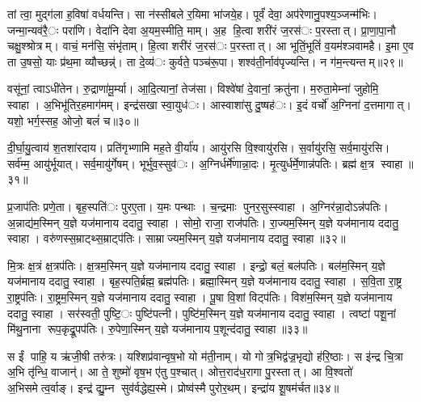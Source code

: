 तां त्वा॒ मुद्ग॑ला ह॒विषा॑ वर्धयन्ति। सा न॑स्सीबले र॒यिमा भा॑जये॒ह। पूर्वं॑ देवा॒ अप॑रेणानु॒पश्य॒ञ्जन्म॑भिः। जन्मा॒न्यव॑रै॒ः परा॑णि। वेदा॑नि देवा अ॒यम॒स्मीति॒ माम्। अ॒ह हि॒त्वा शरी॑रं ज॒रस॑ः प॒रस्तात्। प्रा॒णा॒पा॒नौ चक्षु॒श्श्रोत्रम्। वाचं॒ मन॑सि॒ संभृ॑ताम्। हि॒त्वा शरी॑रं ज॒रस॑ः प॒रस्तात्। आ भूतिं॒भूतिं॑ व॒यम॑श्ञवामहै। इ॒मा ए॒व ता उ॒षसो॒ याः प्र॑थ॒मा व्यौच्छन्न्॑। ता दे॒व्य॑ः कुर्वते॒ पञ्च॑रू॒पा। शश्व॑ती॒र्नाव॑पृज्यन्ति। न ग॑म॒न्त्यन्तम्॥२९॥


वसू॑नां॒ त्वाऽधी॑तेन। रु॒द्राणा॑मू॒र्म्या। आ॒दि॒त्यानां॒ तेज॑सा। विश्वे॑षां दे॒वानां॒ क्रतु॑ना। म॒रुता॒मेम्ना॑ जुहोमि॒ स्वाहा। अ॒भिभू॑तिर॒हमाग॑मम्। इन्द्र॑सखा स्वा॒युध॑ः। आस्वाशा॑सु दु॒ष्षह॑ः। इ॒दं वर्चो॑ अ॒ग्निना॑ द॒त्तमागात्। यशो॒ भर्ग॒स्सह॒ ओजो॒ बलं॑ च॥३०॥

दी॒र्घा॒यु॒त्वाय॑ श॒तशा॑रदाय। प्रति॑गृभ्णामि मह॒ते वी॒र्या॑य। आयु॑रसि वि॒श्वायु॑रसि। स॒र्वायु॑रसि॒ सर्व॒मायु॑रसि। सर्व॑म्म॒ आयु॑र्भूयात्। सर्व॒मायु॑र्गेषम्। भूर्भुव॒स्सुव॑ः। अ॒ग्निर्धर्मे॑णान्ना॒दः। मृ॒त्युर्धर्मे॒णान्न॑पतिः। ब्रह्म॑ क्ष॒त्र स्वाहा॥३१॥

प्र॒जाप॑तिः प्रणे॒ता। बृह॒स्पति॑ः पुरए॒ता। य॒मः पन्थाः। च॒न्द्रमाः पुनर॒सुस्स्वाहा। अ॒ग्निर॑न्ना॒दोऽन्न॑पतिः। अ॒न्नाद्य॑म॒स्मिन् य॒ज्ञे यज॑मानाय ददातु॒ स्वाहा। सोमो॒ राजा॒ राज॑पतिः। रा॒ज्यम॒स्मिन् य॒ज्ञे यज॑मानाय ददातु॒ स्वाहा। वरु॑णस्स॒म्राट्थ्स॒म्राट्प॑तिः। साम्राज्यम॒स्मिन् य॒ज्ञे यज॑मानाय ददातु॒ स्वाहा॥३२॥

मि॒त्रः क्ष॒त्रं क्ष॒त्रप॑तिः। क्ष॒त्रम॒स्मिन् य॒ज्ञे यज॑मानाय ददातु॒ स्वाहा। इन्द्रो॒ बलं॒ बल॑पतिः। बल॑म॒स्मिन् य॒ज्ञे यज॑मानाय ददातु॒ स्वाहा। बृह॒स्पति॒र्ब्रह्म॒ ब्रह्म॑पतिः। ब्रह्मा॒स्मिन् य॒ज्ञे यज॑मानाय ददातु॒ स्वाहा। स॒वि॒ता रा॒ष्ट्र रा॒ष्ट्रप॑तिः। रा॒ष्ट्रम॒स्मिन् य॒ज्ञे यज॑मानाय ददातु॒ स्वाहा। पू॒षा वि॒शां विट्प॑तिः। विश॑म॒स्मिन् य॒ज्ञे यज॑मानाय ददातु॒ स्वाहा। सर॑स्वती॒ पुष्टि॒ः पुष्टि॑पत्नी। पुष्टि॑म॒स्मिन् य॒ज्ञे यज॑मानाय ददातु॒ स्वाहा। त्वष्टा॑ पशू॒नां मि॑थु॒नाना रूप॒कृद्रू॒पप॑तिः। रु॒पेणा॒स्मिन् य॒ज्ञे यज॑मानाय प॒शून्द॑दातु॒ स्वाहा॥३३॥


स ईं पाहि॒ य ऋ॑जी॒षी तरु॑त्रः। यश्शिप्र॑वान्वृष॒भो यो म॑ती॒नाम्। यो गोत्र॒भिद्व॑ज्र॒भृद्यो ह॑रि॒ष्ठाः। स इ॑न्द्र चि॒त्रा अ॒भि तृ॑न्धि॒ वाजान्॑। आ ते॒ शुष्मो॑ वृष॒भ ए॑तु प॒श्चात्। ओत्त॒राद॑ध॒रागा पु॒रस्तात्। आ वि॒श्वतो॑ अ॒भिसमेत्व॒र्वाङ्। इन्द्र॑ द्यु॒म्न सुव॑र्वद्धेह्य॒स्मे। प्रोष्व॑स्मै पुरोर॒थम्। इन्द्रा॑य शू॒षम॑र्चत॥३४॥

